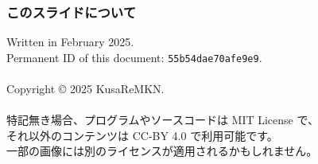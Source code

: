 \documentclass[
  lualatex,
  aspectratio=169,
  14pt
]{beamer}
\begin{document}
\begin{frame}
  \frametitle{このスライドについて}

  Written in February 2025.\\
  \hspace{1.5\zw}Permanent ID of this document: \texttt{55b54dae70afe9e9}.
  \\~\\[-.5\baselineskip]

  Copyright © 2025 KusaReMKN.
  \\~\\[-.5\baselineskip]

  特記無き場合、プログラムやソースコードは MIT License で、\\
  \hspace{1.5\zw}それ以外のコンテンツは CC-BY 4.0 で利用可能です。\\
  \hspace{1.5\zw}一部の画像には別のライセンスが適用されるかもしれません。
\end{frame}
\end{document}
